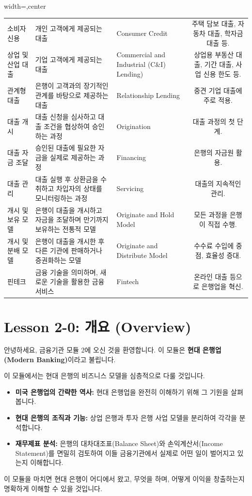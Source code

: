 \documentclass[11pt,a4paper]{book}
\theoremstyle{definition}
\begin{document}
\begin{adjustbox}{width=\textwidth,center}
\begin{tabular}{lllc}
소비자 신용 & 개인 고객에게 제공되는 대출 & Consumer Credit & 주택 담보 대출, 자동차 대출, 학자금 대출 등. \\
상업 및 산업 대출 & 기업 고객에게 제공되는 대출 & Commercial and Industrial (C\&I) Lending) & 상업용 부동산 대출, 기간 대출, 사업 신용 한도 등. \\
관계형 대출 & 은행이 고객과의 장기적인 관계를 바탕으로 제공하는 대출 & Relationship Lending & 중견 기업 대출에 주로 적용. \\
대출 개시 & 대출 신청을 심사하고 대출 조건을 협상하여 승인하는 과정 & Origination & 대출 과정의 첫 단계. \\
대출 자금 조달 & 승인된 대출에 필요한 자금을 실제로 제공하는 과정 & Financing & 은행의 자금원 활용. \\
대출 관리 & 대출 실행 후 상환금을 수취하고 차입자의 상태를 모니터링하는 과정 & Servicing & 대출의 지속적인 관리. \\
개시 및 보유 모델 & 은행이 대출을 개시하고 자금을 조달하며 만기까지 보유하는 전통적 모델 & Originate and Hold Model & 모든 과정을 은행이 직접 수행. \\
개시 및 분배 모델 & 은행이 대출을 개시한 후 다른 기관에 판매하거나 증권화하는 모델 & Originate and Distribute Model & 수수료 수입에 중점, 효율성 증대. \\
핀테크 & 금융 기술을 의미하며, 새로운 기술을 활용한 금융 서비스 & Fintech & 온라인 대출 등으로 은행업을 혁신. \\
\bottomrule
\end{tabular}
\end{adjustbox}


\section{Lesson 2-0: 개요 (Overview)}

안녕하세요, 금융기관 모듈 2에 오신 것을 환영합니다. 이 모듈은 \textbf{현대 은행업(Modern Banking)}이라고 불립니다.

\begin{summarybox}[title={모듈 2의 학습 목표}]
이 모듈에서는 현대 은행의 비즈니스 모델을 심층적으로 다룰 것입니다.
\begin{itemize}
    \item \textbf{미국 은행업의 간략한 역사:} 현대 은행업을 완전히 이해하기 위해 그 기원을 살펴봅니다.
    \item \textbf{현대 은행의 조직과 기능:} 상업 은행과 투자 은행 사업 모델을 분리하여 각각을 분석합니다.
    \item \textbf{재무제표 분석:} 은행의 대차대조표(Balance Sheet)와 손익계산서(Income Statement)를 면밀히 검토하여 이들 금융기관에서 실제로 어떤 일이 벌어지고 있는지 이해합니다.
\end{itemize}
이 모듈을 마치면 현대 은행이 어디에서 왔고, 무엇을 하며, 어떻게 이익을 창출하는지 명확하게 이해할 수 있을 것입니다.
\end{summarybox}
\end{document}
